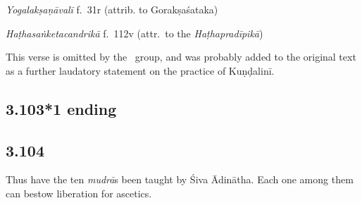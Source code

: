 \begin{ekdosis}
\begin{testimonia}[hp03_103_1]
\emph{Yogalakṣaṇāvalī} f.~31r  (attrib. to Gorakṣaśataka)
\begin{versinnote}
\end{versinnote}


\emph{Haṭhasaṅketacandrikā} f.~112v (attr.~to the \emph{Haṭhapradīpikā})
\begin{versinnote}
\end{versinnote}
\end{testimonia}

\begin{philcomm}[hp03_103_1]
This verse is omitted by the \textalpha\ group, and was probably added to the original text as a further laudatory statement on the practice of Kuṇḍalinī.
\end{philcomm}


\subsection*{3.103*1 ending}
\begin{translation}[hp03_103_1p]
\end{translation}


\subsection*{3.104}
\begin{translation}[hp03_104]
Thus have the ten \emph{mudrā}s been taught by Śiva Ādinātha. Each one among them can bestow liberation for ascetics.
\end{translation}


\end{ekdosis}
